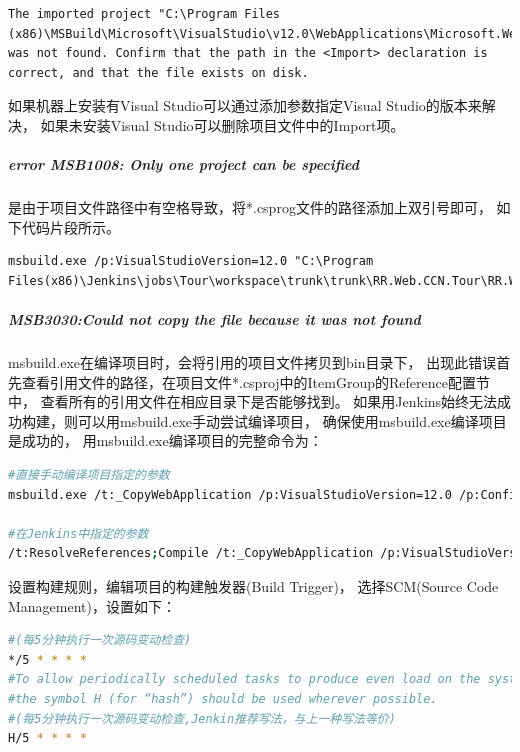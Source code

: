 \documentclass{book}
\begin{document}
\begin{lstlisting}
The imported project "C:\Program Files (x86)\MSBuild\Microsoft\VisualStudio\v12.0\WebApplications\Microsoft.WebApplication.targets" was not found. Confirm that the path in the <Import> declaration is correct, and that the file exists on disk.
\end{lstlisting}

如果机器上安装有Visual Studio可以通过添加参数指定Visual Studio的版本来解决，
如果未安装Visual Studio可以删除项目文件中的Import项。

\subparagraph{error MSB1008: Only one project can be specified}

是由于项目文件路径中有空格导致，将*.csprog文件的路径添加上双引号即可，
如下代码片段所示。

\begin{lstlisting}
msbuild.exe /p:VisualStudioVersion=12.0 "C:\Program Files(x86)\Jenkins\jobs\Tour\workspace\trunk\trunk\RR.Web.CCN.Tour\RR.Web.CCN.Tour.csproj"
\end{lstlisting}

\subparagraph{MSB3030:Could not copy the file because it was not found}

msbuild.exe在编译项目时，会将引用的项目文件拷贝到bin目录下，
出现此错误首先查看引用文件的路径，在项目文件*.csproj中的ItemGroup的Reference配置节中，
查看所有的引用文件在相应目录下是否能够找到。
如果用Jenkins始终无法成功构建，则可以用msbuild.exe手动尝试编译项目，
确保使用msbuild.exe编译项目是成功的，
用msbuild.exe编译项目的完整命令为：

\begin{lstlisting}[language=Bash]
#直接手动编译项目指定的参数
msbuild.exe /t:_CopyWebApplication /p:VisualStudioVersion=12.0 /p:Configuration=Release /p:outDir="E:\JenkinsPublish\Bin" "C:\Program Files (x86)\Jenkins\jobs\Tour\workspace\trunk\trunk\RR.Web.CCN.Tour\RR.Web.CCN.Tour.csproj"

#在Jenkins中指定的参数
/t:ResolveReferences;Compile /t:_CopyWebApplication /p:VisualStudioVersion=12.0 /p:Configuration=Release /p:WebProjectOutputDir=E:\Web\RR.Web.CCN.Tour\1.0.1 /p:OutputPath=E:\JenkinsPublish\Bin
\end{lstlisting}

设置构建规则，编辑项目的构建触发器(Build Trigger)，
选择SCM(Source Code Management)，设置如下：

\begin{lstlisting}[language=Bash]
#(每5分钟执行一次源码变动检查)
*/5 * * * *
#To allow periodically scheduled tasks to produce even load on the system
#the symbol H (for “hash”) should be used wherever possible. 
#(每5分钟执行一次源码变动检查,Jenkin推荐写法，与上一种写法等价)
H/5 * * * *
\end{lstlisting}
\end{document}

